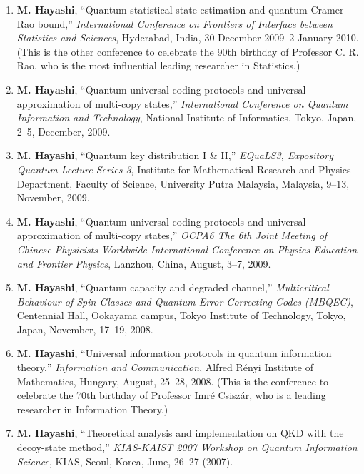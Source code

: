 \documentclass[a4paper,12pt,oneside]{article}
\begin{document}
\begin{enumerate}
\item 
\textbf{M. Hayashi}, 
``Quantum statistical state estimation and quantum Cramer-Rao bound,'' 
{\em International Conference on Frontiers of Interface between Statistics and Sciences}, 
Hyderabad, India, 30 December 2009--2 January 2010.
(This is the other conference to celebrate the 90th birthday of Professor C. R. Rao,
who is the most influential leading researcher in Statistics.)


\item 
\textbf{M. Hayashi}, 
``Quantum universal coding protocols and universal approximation of multi-copy states,'' 
{\em International Conference on Quantum Information and Technology}, 
National Institute of Informatics, Tokyo, Japan, 2--5, December, 2009.

\item 
\textbf{M. Hayashi}, 
``Quantum key distribution I \& II,'' 
{\em EQuaLS3, Expository Quantum Lecture Series 3}, 
Institute for Mathematical Research and Physics Department, Faculty of Science, University Putra Malaysia, Malaysia, 9--13, November, 2009.

\item 
\textbf{M. Hayashi}, 
``Quantum universal coding protocols and universal approximation of multi-copy states,'' 
{\em OCPA6 The 6th Joint Meeting of Chinese Physicists Worldwide International Conference on Physics Education and Frontier Physics}, 
Lanzhou, China, August, 3--7, 2009.

\item 
\textbf{M. Hayashi}, ``Quantum capacity and degraded channel,'' 
{\em Multicritical Behaviour of Spin Glasses and Quantum Error Correcting Codes (MBQEC)}, 
Centennial Hall, Ookayama campus, Tokyo Institute of Technology, Tokyo, Japan, November, 17--19, 2008.

\item 
\textbf{M. Hayashi}, ``Universal information protocols in quantum information theory,'' 
{\em Information and Communication}, 
Alfred R\'{e}nyi Institute of Mathematics, Hungary, August, 25--28, 2008.
(This is the conference 
to celebrate the 70th birthday of Professor Imr\'{e} Csisz\'{a}r,
who is a leading researcher in Information Theory.)

\item
\textbf{M. Hayashi}, ``Theoretical analysis and implementation on QKD with the decoy-state method,'' 
{\em KIAS-KAIST 2007 Workshop on Quantum Information Science}, KIAS, Seoul, Korea, June, 26--27 (2007).


\end{enumerate}
\end{document}
